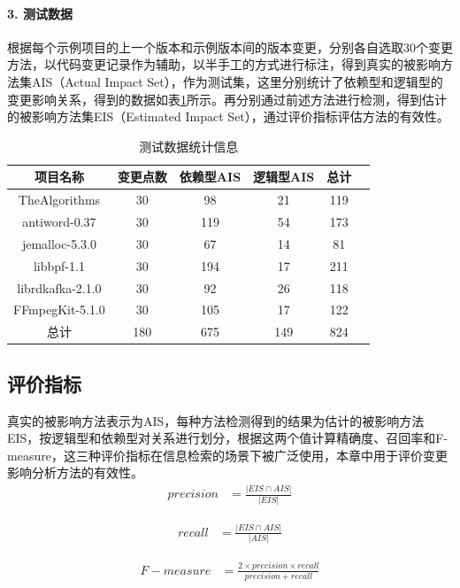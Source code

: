 \paragraph{3. 测试数据}
根据每个示例项目的上一个版本和示例版本间的版本变更，分别各自选取30个变更方法，以代码变更记录作为辅助，以半手工的方式进行标注，得到真实的被影响方法集AIS（Actual Impact Set），作为测试集，这里分别统计了依赖型和逻辑型的变更影响关系，得到的数据如表\ref{1_test_data_info}所示。再分别通过前述方法进行检测，得到估计的被影响方法集EIS（Estimated Impact Set），通过评价指标评估方法的有效性。

\begin{table}[htbp]
\caption{测试数据统计信息}
\label{1_test_data_info}
\vspace{0.5em}\centering\wuhao
\begin{tabular}{cccccc}
\toprule
项目名称  & 变更点数 & 依赖型AIS & 逻辑型AIS & 总计 \\
\midrule
TheAlgorithms  & 30 & 98 & 21 & 119\\
antiword-0.37  & 30 & 119 & 54 & 173 \\
jemalloc-5.3.0   & 30 & 67 & 14 & 81 \\
libbpf-1.1  & 30 & 194 & 17 & 211 \\
librdkafka-2.1.0  & 30 & 92 & 26 & 118\\
FFmpegKit-5.1.0  & 30 & 105 & 17 & 122\\
总计  & 180 & 675 & 149 & 824 \\
\bottomrule
\end{tabular}
\end{table}


\subsection{评价指标}\label{1_评价指标}

真实的被影响方法表示为AIS，每种方法检测得到的结果为估计的被影响方法EIS，按逻辑型和依赖型对关系进行划分，根据这两个值计算精确度、召回率和F-measure，这三种评价指标在信息检索的场景下被广泛使用，本章中用于评价变更影响分析方法的有效性。
\begin{align}
precision &= \frac{|EIS \cap AIS|}{|EIS|} 
\end{align}

\begin{align}
recall &= \frac{|EIS \cap AIS|}{|AIS|}  
\end{align}

\begin{align}
F-measure &= \frac{2 \times precision \times recall}{precision + recall} 
\end{align}


